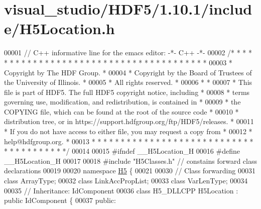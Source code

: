 \hypertarget{visual__studio_2_h_d_f5_21_810_81_2include_2_h5_location_8h_source}{}\section{visual\+\_\+studio/\+H\+D\+F5/1.10.1/include/\+H5\+Location.h}
\label{visual__studio_2_h_d_f5_21_810_81_2include_2_h5_location_8h_source}

\begin{DoxyCode}
00001 \textcolor{comment}{// C++ informative line for the emacs editor: -*- C++ -*-}
00002 \textcolor{comment}{/* * * * * * * * * * * * * * * * * * * * * * * * * * * * * * * * * * * * * * *}
00003 \textcolor{comment}{ * Copyright by The HDF Group.                                               *}
00004 \textcolor{comment}{ * Copyright by the Board of Trustees of the University of Illinois.         *}
00005 \textcolor{comment}{ * All rights reserved.                                                      *}
00006 \textcolor{comment}{ *                                                                           *}
00007 \textcolor{comment}{ * This file is part of HDF5.  The full HDF5 copyright notice, including     *}
00008 \textcolor{comment}{ * terms governing use, modification, and redistribution, is contained in    *}
00009 \textcolor{comment}{ * the COPYING file, which can be found at the root of the source code       *}
00010 \textcolor{comment}{ * distribution tree, or in https://support.hdfgroup.org/ftp/HDF5/releases.  *}
00011 \textcolor{comment}{ * If you do not have access to either file, you may request a copy from     *}
00012 \textcolor{comment}{ * help@hdfgroup.org.                                                        *}
00013 \textcolor{comment}{ * * * * * * * * * * * * * * * * * * * * * * * * * * * * * * * * * * * * * * */}
00014 
00015 \textcolor{preprocessor}{#ifndef \_\_H5Location\_H}
00016 \textcolor{preprocessor}{#define \_\_H5Location\_H}
00017 
00018 \textcolor{preprocessor}{#include "H5Classes.h"}        \textcolor{comment}{// constains forward class declarations}
00019 
00020 \textcolor{keyword}{namespace }\hyperlink{namespace_h5}{H5} \{
00021 
00030 \textcolor{comment}{// Class forwarding}
00031 \textcolor{keyword}{class }ArrayType;
00032 \textcolor{keyword}{class }LinkAccPropList;
00033 \textcolor{keyword}{class }VarLenType;
00034 
00035 \textcolor{comment}{//  Inheritance: IdComponent}
00036 \textcolor{keyword}{class }H5\_DLLCPP H5Location : \textcolor{keyword}{public} IdComponent \{
00037    \textcolor{keyword}{public}:

\end{DoxyCode}
